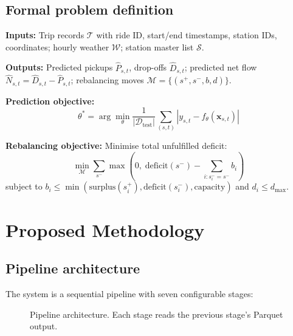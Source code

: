 \documentclass[12pt,a4paper]{report}
\begin{document}
\section{Formal problem definition}

\textbf{Inputs:} Trip records $\mathcal{T}$ with ride ID, start/end
timestamps, station IDs, coordinates; hourly weather $\mathcal{W}$;
station master list $\mathcal{S}$.

\textbf{Outputs:} Predicted pickups $\hat{P}_{s,t}$, drop-offs
$\hat{D}_{s,t}$; predicted net flow $\hat{N}_{s,t} = \hat{D}_{s,t} -
\hat{P}_{s,t}$; rebalancing moves $\mathcal{M} = \{(s^+, s^-, b,
d)\}$.

\textbf{Prediction objective:}
\begin{equation}
\theta^* = \arg\min_\theta \frac{1}{|\mathcal{D}_{\text{test}}|}
\sum_{(s,t)} \left| y_{s,t} - f_\theta(\mathbf{x}_{s,t}) \right|
\end{equation}

\textbf{Rebalancing objective:} Minimise total unfulfilled deficit:
\begin{equation}
\min_{\mathcal{M}} \sum_{s^-} \max\!\left(0,\;
\text{deficit}(s^-) - \textstyle\sum_{i: s^-_i = s^-} b_i\right)
\end{equation}
subject to $b_i \leq \min(\text{surplus}(s^+_i),
\text{deficit}(s^-_i), \text{capacity})$ and $d_i \leq d_{\max}$.

\chapter{Proposed Methodology}

\section{Pipeline architecture}

The system is a sequential pipeline with seven configurable stages:

\begin{figure}[H]
\centering
{}
\caption{Pipeline architecture. Each stage reads the previous
stage's Parquet output.}
\label{fig:arch}
\end{figure}
\end{document}
